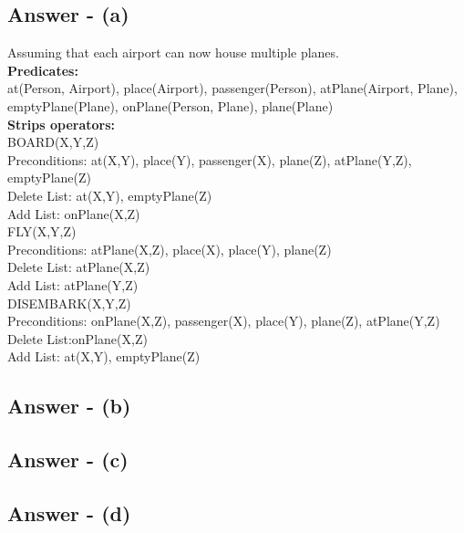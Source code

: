 \documentclass{article}
\begin{document}
\subsection{Answer - (a)}
Assuming that each airport can now house multiple planes. \\
\newline
\textbf{Predicates: }\\
\newline
at(Person, Airport), place(Airport), passenger(Person),
atPlane(Airport, Plane), emptyPlane(Plane), onPlane(Person, Plane), plane(Plane) \\
\newline
\textbf{Strips operators: }\\
\newline
BOARD(X,Y,Z) \\
\-\hspace{10mm} Preconditions: at(X,Y), place(Y), passenger(X), plane(Z), atPlane(Y,Z), emptyPlane(Z) \\
\-\hspace{10mm} Delete List: at(X,Y), emptyPlane(Z) \\
\-\hspace{10mm} Add List: onPlane(X,Z) \\
\newline
FLY(X,Y,Z) \\
\-\hspace{10mm} Preconditions: atPlane(X,Z), place(X), place(Y), plane(Z) \\
\-\hspace{10mm} Delete List: atPlane(X,Z) \\
\-\hspace{10mm} Add List: atPlane(Y,Z) \\
\newline
DISEMBARK(X,Y,Z) \\
\-\hspace{10mm} Preconditions: onPlane(X,Z), passenger(X), place(Y), plane(Z), atPlane(Y,Z) \\
\-\hspace{10mm} Delete List:onPlane(X,Z) \\
\-\hspace{10mm} Add List: at(X,Y), emptyPlane(Z) \\
\newline
\subsection{Answer - (b)}
\subsection{Answer - (c)}
\subsection{Answer - (d)}
\end{document}
